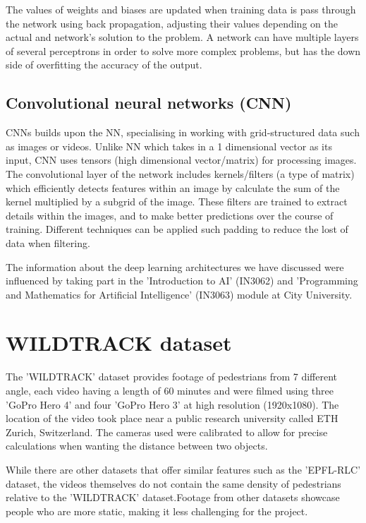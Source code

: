 \documentclass[12pt]{report}
\begin{document}
\vspace{5 mm}

The values of weights and biases are updated when training data is pass through the network using back propagation, adjusting their values depending on the actual and network's solution to the problem. A network can have multiple layers of several perceptrons in order to solve more complex problems, but has the down side of overfitting the accuracy of the output.


\subsection{Convolutional neural networks (CNN)}

CNNs builds upon the NN, specialising in working with grid-structured data such as images or videos. Unlike NN which takes in a 1 dimensional vector as its input, CNN uses tensors (high dimensional vector/matrix) for processing images. The convolutional layer of the network includes kernels/filters (a type of matrix) which efficiently detects features within an image by calculate the sum of the kernel multiplied by a subgrid of the image. These filters are trained to extract details within the images, and to make better predictions over the course of training. Different techniques can be applied such padding to reduce the lost of data when filtering.

The information about the deep learning architectures we have discussed were influenced by taking part in the 'Introduction to AI' (IN3062) and 'Programming and Mathematics for Artificial Intelligence' (IN3063) module at City University.

\section{WILDTRACK dataset}

The 'WILDTRACK' dataset provides footage of pedestrians from 7 different angle, each video having a length of 60 minutes and were filmed using three 'GoPro Hero 4' and four 'GoPro Hero 3' at high resolution (1920x1080). The location of the video took place near a public research university called ETH Zurich, Switzerland. The cameras used were calibrated to allow for precise calculations when wanting the distance between two objects.

While there are other datasets that offer similar features such as the 'EPFL-RLC' dataset, the videos themselves do not contain the same density of pedestrians relative to the 'WILDTRACK' dataset.Footage from other datasets showcase people who are more static, making it less challenging for the project.
\end{document}
